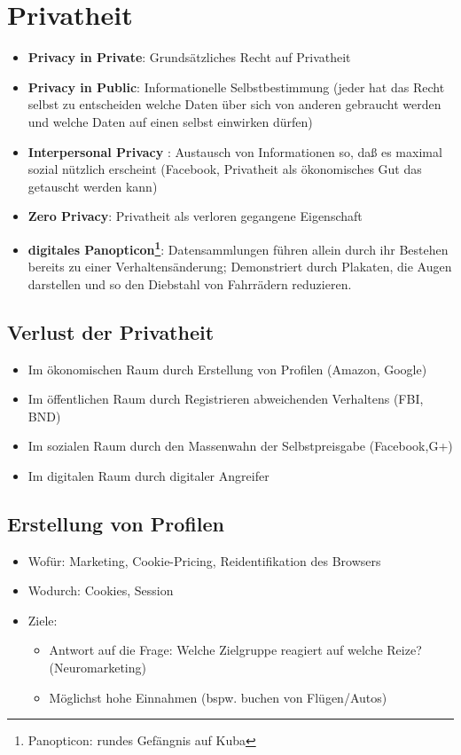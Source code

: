 \documentclass{article} %
\begin{document}
\section{Privatheit}
	\begin{itemize}
		\item \glqq \textbf{Privacy in Private}\grqq: Grundsätzliches Recht auf Privatheit
		\item \glqq \textbf{Privacy in Public}\grqq: Informationelle Selbstbestimmung (jeder hat das Recht selbst zu entscheiden welche Daten über sich von anderen gebraucht werden und welche Daten auf einen selbst einwirken dürfen)
		\item \glqq \textbf{Interpersonal Privacy} \grqq: Austausch von Informationen so, daß es maximal sozial nützlich
		erscheint (Facebook, Privatheit als ökonomisches Gut das getauscht werden kann)
		\item \glqq \textbf{Zero Privacy}\grqq: Privatheit als verloren gegangene Eigenschaft
		\item \textbf{digitales Panopticon\footnote{Panopticon: rundes Gefängnis auf Kuba}}: Datensammlungen führen allein durch ihr Bestehen bereits zu einer Verhaltensänderung; Demonstriert durch Plakaten, die Augen darstellen und so den Diebstahl von Fahrrädern reduzieren.
	\end{itemize}
	\subsection{Verlust der Privatheit}
	\begin{itemize}
			\item Im ökonomischen Raum durch Erstellung von Profilen (Amazon, Google)
			\item Im öffentlichen Raum durch Registrieren abweichenden Verhaltens (FBI, BND)
			\item Im sozialen Raum durch den Massenwahn der Selbstpreisgabe (Facebook,G+)
			\item Im digitalen Raum durch digitaler Angreifer
	\end{itemize}
		\subsection{Erstellung von Profilen}
	\begin{itemize}
		\item Wofür: Marketing, Cookie-Pricing, Reidentifikation des Browsers
		\item Wodurch: Cookies, Session
		\item Ziele:
		\begin{itemize}
			\item Antwort auf die Frage: \glqq Welche Zielgruppe reagiert auf welche Reize?\grqq (Neuromarketing)
			\item Möglichst hohe Einnahmen (bspw. buchen von Flügen/Autos)
		\end{itemize}
	\end{itemize}
\end{document}
